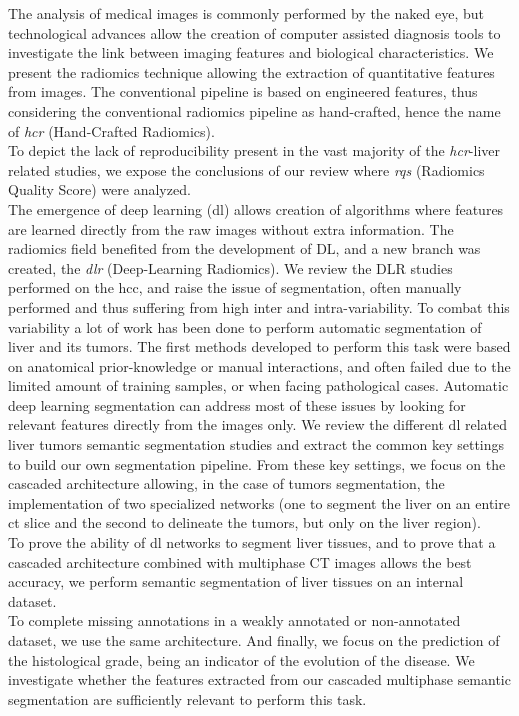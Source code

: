 The analysis of medical images is commonly performed by the naked eye,
but technological advances allow the creation of computer assisted
diagnosis tools to investigate the link between imaging features 
and biological characteristics.
We present the radiomics technique allowing the extraction of
quantitative features from images. The conventional pipeline is based on 
engineered features, thus considering the conventional radiomics pipeline as
hand-crafted, hence the name of \emph{\ac{hcr}} (Hand-Crafted Radiomics).\\
To depict the lack of reproducibility present in the vast majority of
the \emph{\ac{hcr}}-liver related studies, we expose the conclusions of our
review where \emph{\ac{rqs}} (Radiomics Quality Score) were analyzed.\\
The emergence of deep learning (\ac{dl}) allows creation of algorithms where
features are learned directly from the raw images without extra information. 
The radiomics field benefited from the development of DL, and a new branch 
was created, the \emph{\ac{dlr}} (Deep-Learning Radiomics).
We review the DLR studies performed on the \ac{hcc}, and raise the issue of
segmentation, often manually performed and thus suffering from high
inter and intra-variability.
To combat this variability a lot of work has been done to perform
automatic segmentation of liver and its tumors.
The first methods developed to perform this task were based on
anatomical prior-knowledge or manual interactions, and often failed due to 
the limited amount of training samples, or when
facing pathological cases.
Automatic deep learning segmentation can address most of these issues by
looking for relevant features directly from the images only.
We review the different \ac{dl} related liver tumors semantic segmentation
studies and extract the common key settings to build our own segmentation pipeline.
From these key settings, we focus on the cascaded architecture allowing,
in the case of tumors segmentation, the implementation of two specialized
networks (one to segment the liver on an entire \ac{ct} slice and the second to delineate the
tumors, but only on the liver region).\\
To prove the ability of \ac{dl} networks to segment liver tissues, and to
prove that a cascaded architecture combined with multiphase CT images
allows the best accuracy, we perform semantic segmentation of liver
tissues on an internal dataset.\\
To complete missing annotations in a weakly annotated or non-annotated
dataset, we use the same architecture.
And finally, we focus on the prediction of the histological grade, being
an indicator of the evolution of the disease. We investigate whether the
features extracted from our cascaded multiphase semantic segmentation
are sufficiently relevant to perform this task.
